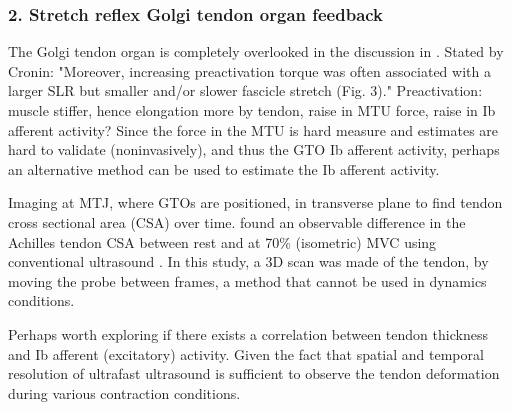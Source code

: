 


\subsubsection{2. Stretch reflex Golgi tendon organ feedback}
The Golgi tendon organ is completely overlooked in the discussion in \citet{cronin_triceps_2015}. 
Stated by Cronin: "Moreover, increasing preactivation torque was often associated with a larger SLR but smaller and/or slower fascicle stretch (Fig. 3)." Preactivation: muscle stiffer, hence elongation more by tendon, raise in MTU force, raise in Ib afferent activity? 
Since the force in the MTU is hard measure and estimates are hard to validate (noninvasively), and thus the GTO Ib afferent activity, perhaps an alternative method can be used to estimate the Ib afferent activity. %

Imaging at MTJ, where GTOs are positioned, in transverse plane to find tendon cross sectional area (CSA) over time.  \citeauthor{obst_three-dimensional_2014} found an observable difference in the Achilles tendon CSA between rest and at 70\% (isometric) MVC using conventional ultrasound \cite{obst_three-dimensional_2014}. In this study, a 3D scan was made of the tendon, by moving the probe between frames, a method that cannot be used in dynamics conditions. 

Perhaps worth exploring if there exists a correlation between tendon thickness and Ib afferent (excitatory) activity. Given the fact that spatial and temporal resolution of ultrafast ultrasound is sufficient to observe the tendon deformation during various contraction conditions. 

